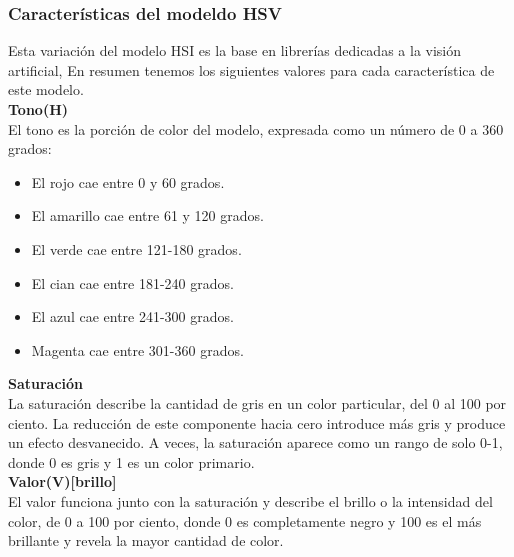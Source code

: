 \subsubsection{Características del modeldo HSV}
Esta variación del modelo HSI es la base en librerías dedicadas a la visión artificial,
En resumen tenemos los siguientes valores para cada característica de este modelo.\\
\textbf{Tono(H)}\\
El tono es la porción de color del modelo, expresada como un número de 0 a 360 grados:
\begin{itemize}
	\item El rojo cae entre 0 y 60 grados.
	\item El amarillo cae entre 61 y 120 grados.
	\item El verde cae entre 121-180 grados.
	\item El cian cae entre 181-240 grados.
	\item El azul cae entre 241-300 grados.
	\item Magenta cae entre 301-360 grados.
\end{itemize}
\textbf{Saturación}\\
La saturación describe la cantidad de gris en un color particular, del 0 al 100 por
ciento. La reducción de este componente hacia cero introduce más gris y produce un
efecto desvanecido. A veces, la saturación aparece como un rango de solo 0-1, donde 0
es gris y 1 es un color primario.\\
\textbf{Valor(V)[brillo]}\\
El valor funciona junto con la saturación y describe el brillo o la intensidad del
color, de 0 a 100 por ciento, donde 0 es completamente negro y 100 es el más brillante
y revela la mayor cantidad de color.

